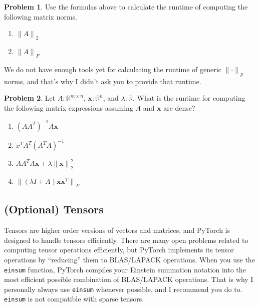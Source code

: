 \documentclass[10pt]{article}
\theoremstyle{definition}
\newtheorem{problem}{Problem}
\newcommand{\R}{\mathbb R}
\newcommand{\trans}[1]{{#1}^{T}}
\newcommand{\x}{\mathbf x}
\newcommand{\ltwo}[1]{{\lVert {#1} \rVert}_2}
\newcommand{\lp}[1]{{\lVert {#1} \rVert}_p}
\newcommand{\lF}[1]{{\lVert {#1} \rVert}_F}
\begin{document}
\begin{problem}
    Use the formulas above to calculate the runtime of computing the following matrix norms.
    \begin{enumerate}
        \item $\ltwo{A}$
            \vspace{1in}
        \item $\lF{A}$
            \vspace{1in}
    \end{enumerate}
    We do not have enough tools yet for calculating the runtime of generic $\lp{\cdot}$ norms,
    and that's why I didn't ask you to provide that runtime.
\end{problem}

\begin{problem}
    Let $A : \R^{m \times n}$, $\x : \R^n$, and $\lambda : \R$.
    What is the runtime for computing the following matrix expressions assuming $A$ and $\x$ are dense?
    \begin{enumerate}
        \item $(A \trans A)^{-1} A \x$
            \vspace{2in}
        \item $\trans x \trans A (\trans A A)^{-1}$
            \vspace{2in}
        \item $A \trans A A \x + \lambda \ltwo{\x}^2$
            \vspace{2in}
        \item $\lF{(\lambda I + A) \x \trans \x}$
            \vspace{2in}
    \end{enumerate}
\end{problem}


\subsection{(Optional) Tensors}

Tensors are higher order versions of vectors and matrices,
and PyTorch is designed to handle tensors efficiently.
There are many open problems related to computing tensor operations efficiently,
but PyTorch implements its tensor operations by ``reducing'' them to BLAS/LAPACK operations.
When you use the \texttt{einsum} function,
PyTorch compiles your Einstein summation notation into the most efficient possible combination of BLAS/LAPACK operations.
That is why I personally always use \texttt{einsum} whenever possible,
and I recommend you do to.
\texttt{einsum} is not compatible with sparse tensors.
\end{document}
